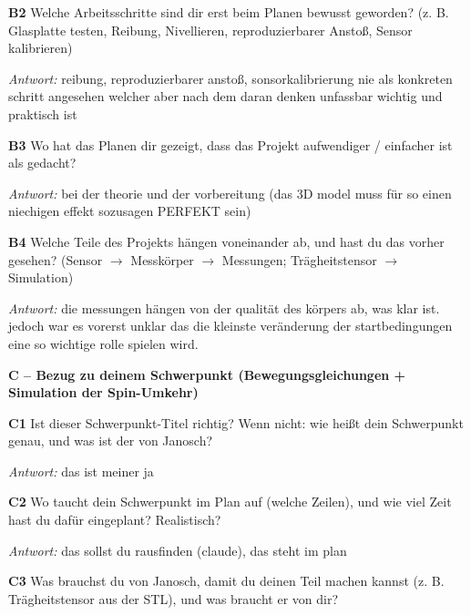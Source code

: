 {\par\noindent \textbf{B2} Welche Arbeitsschritte sind dir erst beim Planen bewusst geworden? (z. B. Glasplatte testen, Reibung, Nivellieren, reproduzierbarer Anstoß, Sensor kalibrieren)\par
\par\noindent\emph{Antwort:} reibung, reproduzierbarer anstoß, sonsorkalibrierung nie als konkreten schritt angesehen welcher aber nach dem daran denken unfassbar wichtig und praktisch ist\par\smallskip
\par\noindent \textbf{B3} Wo hat das Planen dir gezeigt, dass das Projekt aufwendiger / einfacher ist als gedacht?\par
\par\noindent\emph{Antwort:} bei der theorie und der vorbereitung (das 3D model muss für so einen niechigen effekt sozusagen PERFEKT sein)\par\smallskip
\par\noindent \textbf{B4} Welche Teile des Projekts hängen voneinander ab, und hast du das vorher gesehen? (Sensor $\rightarrow$ Messkörper $\rightarrow$ Messungen; Trägheitstensor $\rightarrow$ Simulation)\par
\par\noindent\emph{Antwort:} die messungen hängen von der qualität des körpers ab, was klar ist. jedoch war es vorerst unklar das die kleinste veränderung der startbedingungen eine so wichtige rolle spielen wird.\par\smallskip
\par\medskip\noindent\textbf{C – Bezug zu deinem Schwerpunkt (Bewegungsgleichungen + Simulation der Spin-Umkehr)}\par
\par\noindent \textbf{C1} Ist dieser Schwerpunkt-Titel richtig? Wenn nicht: wie heißt dein Schwerpunkt genau, und was ist der von Janosch?\par
\par\noindent\emph{Antwort:} das ist meiner ja\par\smallskip
\par\noindent \textbf{C2} Wo taucht dein Schwerpunkt im Plan auf (welche Zeilen), und wie viel Zeit hast du dafür eingeplant? Realistisch?\par
\par\noindent\emph{Antwort:} das sollst du rausfinden (claude), das steht im plan\par\smallskip
\par\noindent \textbf{C3} Was brauchst du von Janosch, damit du deinen Teil machen kannst (z. B. Trägheitstensor aus der STL), und was braucht er von dir?\par
}
